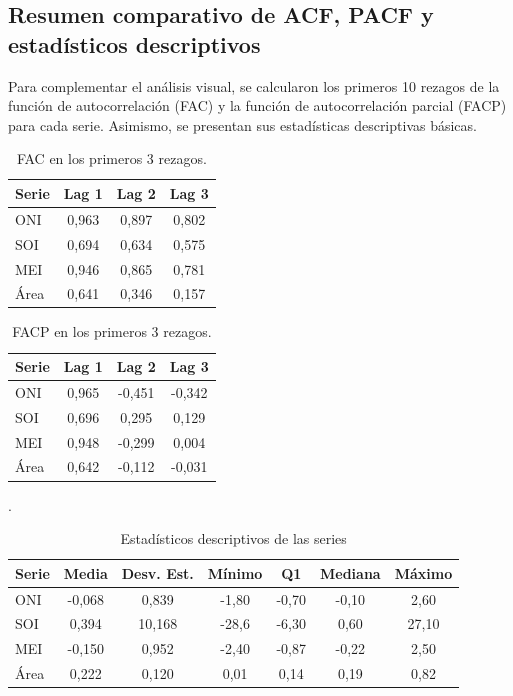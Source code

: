 \subsection{Resumen comparativo de ACF, PACF y estadísticos descriptivos}

Para complementar el análisis visual, se calcularon los primeros 10 rezagos de la función 
de autocorrelación (FAC) y la función de autocorrelación parcial (FACP) para cada serie. 
Asimismo, se presentan sus estadísticas descriptivas básicas. 

\begin{table}[H]
    \centering
    \caption{FAC en los primeros 3 rezagos.}
    \label{tab:fac}
    \begin{tabular}{lccc}
        \toprule
        \textbf{Serie} & \textbf{Lag 1} & \textbf{Lag 2} & \textbf{Lag 3} \\
        \midrule
        ONI  & 0,963 & 0,897 & 0,802 \\
        SOI  & 0,694 & 0,634 & 0,575 \\
        MEI  & 0,946 & 0,865 & 0,781 \\
        Área & 0,641 & 0,346 & 0,157 \\
        \bottomrule
    \end{tabular}
\end{table}

\begin{table}[H]
    \centering
    \caption{FACP en los primeros 3 rezagos.}
    \label{tab:facp}
    \begin{tabular}{lccc}
        \toprule
        \textbf{Serie} & \textbf{Lag 1} & \textbf{Lag 2} & \textbf{Lag 3} \\
        \midrule
        ONI  & 0,965 & -0,451 & -0,342 \\
        SOI  & 0,696 &  0,295 &  0,129 \\
        MEI  & 0,948 & -0,299 &  0,004 \\
        Área & 0,642 & -0,112 & -0,031 \\
        \bottomrule
    \end{tabular}
\end{table}


\begin{table}[H]
    \centering
    \caption{Estadísticos descriptivos de las series}.
    \label{tab:descriptivos}
    \begin{tabular}{lcccccc}
        \toprule
        Serie & Media & Desv. Est. & Mínimo & Q1 & Mediana & Máximo \\
        \midrule
        ONI   & -0,068 & 0,839 & -1,80 & -0,70 & -0,10 &  2,60 \\
        SOI   &  0,394 & 10,168 & -28,6 & -6,30 &  0,60 & 27,10 \\
        MEI   & -0,150 & 0,952 & -2,40 & -0,87 & -0,22 &  2,50 \\
        Área  &  0,222 & 0,120 &  0,01 &  0,14 &  0,19 &  0,82 \\
        \bottomrule
    \end{tabular}
\end{table}


